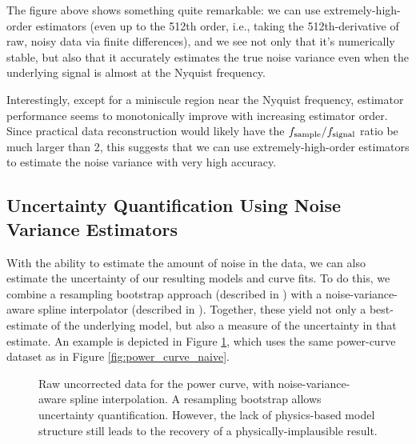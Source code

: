 \documentclass[conf]{new-aiaa}
\begin{document}
    The figure above shows something quite remarkable: we can use extremely-high-order estimators (even up to the 512th order, i.e., taking the 512th-derivative of raw, noisy data via finite differences), and we see not only that it's numerically stable, but also that it accurately estimates the true noise variance even when the underlying signal is almost at the Nyquist frequency.

    Interestingly, except for a miniscule region near the Nyquist frequency, estimator performance seems to monotonically improve with increasing estimator order. Since practical data reconstruction would likely have the $f_{\rm sample} / f_{\rm signal}$ ratio be much larger than 2, this suggests that we can use extremely-high-order estimators to estimate the noise variance with very high accuracy.

    \subsection{Uncertainty Quantification Using Noise Variance Estimators}

    With the ability to estimate the amount of noise in the data, we can also estimate the uncertainty of our resulting models and curve fits. To do this, we combine a resampling bootstrap approach (described in \cite{surrogates, elements_of_statistical_learning}) with a noise-variance-aware spline interpolator (described in \cite{surrogates, wahba}). Together, these yield not only a best-estimate of the underlying model, but also a measure of the uncertainty in that estimate. An example is depicted in Figure \ref{fig:power_curve_spline_but_no_physics}, which uses the same power-curve dataset as in Figure \ref{fig:power_curve_naive}.

    \begin{figure}[!htb]
        \centering
        \caption{Raw uncorrected data for the power curve, with noise-variance-aware spline interpolation. A resampling bootstrap allows uncertainty quantification. However, the lack of physics-based model structure still leads to the recovery of a physically-implausible result.}
        \label{fig:power_curve_spline_but_no_physics}
    \end{figure}
\end{document}
